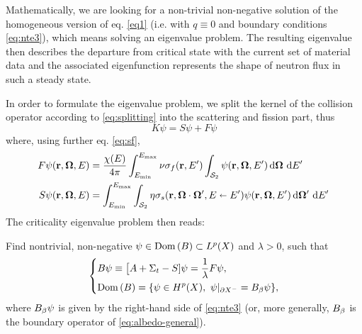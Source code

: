 Mathematically, we are looking for a non-trivial non-negative solution of the homogeneous
version of eq. \eqref{eq1} (i.e. with $q\equiv 0$ and boundary conditions \eqref{eq:nte3}), which means solving an
eigenvalue problem. The resulting eigenvalue then describes the departure from critical state with the current set of material
data and the associated eigenfunction represents the shape of neutron flux in such a steady state. 

In order to formulate
the eigenvalue problem, we split the kernel of the collision operator according to \eqref{eq:splitting} into the 
scattering and fission part, thus
$$
K\psi
  			= S\psi + F\psi
$$%
where, using further eq. \eqref{eq:sf},
\begin{equation}\label{eq:FScrit}
\begin{aligned}
F\psi(\br,\bomega,E) &= \frac{\chi(E)}{4\pi}\intE[']{\Emin}{\Emax}{\nu\sigma_f(\br,E')\intA{\psi(\br,\bomega,E')}}\\
S\psi(\br,\bomega,E) &= \intE[']{\Emin}{\Emax}{\intA[']{\eta\sigma_s(\br,\bomega\cdot\bomega',E\sla
E')\psi(\br,\bomega,E')}}
\end{aligned}
\end{equation}
The criticality eigenvalue problem then reads:
\begin{problem}\label{prb:3}
Find nontrivial, non-negative $\psi\in \Dom{B} \subset \Lp(X)$ and $\lambda > 0$, such that
\begin{equation}\label{eq:critical}
\left\{
  \begin{aligned}
     &B\psi \equiv \bigl[A + \Sigma_t - S]\psi = \frac{1}{\lambda} F\psi,\\
     &\Dom{B} = \{\psi\in \Hp(X),\ \psi\vert_{\pX[-]} = \albedoop\psi\},
  \end{aligned}
\right.
\end{equation}
\index{$\lambda$}%
where $\albedoop\psi$ is given by the right-hand side of \eqref{eq:nte3} (or, more generally, $\albedoop$ is the
boundary operator of \eqref{eq:albedo-general}).
\end{problem}  

